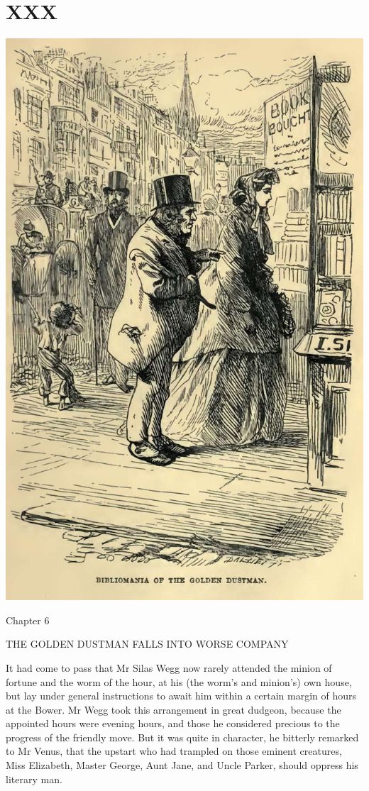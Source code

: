 
\chapter{XXX}

\includegraphics[scale=2.3]{03-05-01}

Chapter 6

THE GOLDEN DUSTMAN FALLS INTO WORSE COMPANY


It had come to pass that Mr Silas Wegg now rarely attended the minion of
fortune and the worm of the hour, at his (the worm’s and minion’s) own
house, but lay under general instructions to await him within a certain
margin of hours at the Bower. Mr Wegg took this arrangement in great
dudgeon, because the appointed hours were evening hours, and those he
considered precious to the progress of the friendly move. But it was
quite in character, he bitterly remarked to Mr Venus, that the upstart
who had trampled on those eminent creatures, Miss Elizabeth, Master
George, Aunt Jane, and Uncle Parker, should oppress his literary man.

